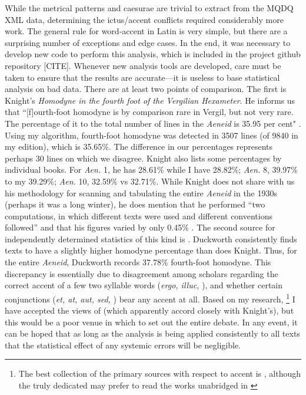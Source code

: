 \documentclass[11pt,a4paper]{scrartcl} %
\begin{document}
{While the metrical patterns and caesurae are trivial to extract from the MQDQ XML data, determining the ictus/accent conflicts required considerably more work. The general rule for word-accent in Latin is very simple, but there are a surprising number of exceptions and edge cases. In the end, it was necessary to develop new code to perform this analysis, which is included in the project github repository [CITE]. Whenever new analysis tools are developed, care must be taken to ensure that the results are accurate---it is useless to base statistical analysis on bad data. There are at least two points of comparison. The first is Knight's \textit{Homodyne in the fourth foot of the Vergilian Hexameter}. He informs us that ``[f]ourth-foot homodyne is by comparison rare in Vergil, but not very rare. The percentage of it to the total number of lines in the \textit{Aeneid} is 35.95 per cent" \cite[186]{knight_homodyne_1931}. Using my algorithm, fourth-foot homodyne was detected in 3507 lines (of 9840 in my edition), which is 35.65\%. The difference in our percentages represents perhaps 30 lines on which we disagree. Knight also lists some percentages by individual books. For \textit{Aen.} 1, he has 28.61\% while I have 28.82\%; \textit{Aen.} 8, 39.97\% to my 39.29\%; \textit{Aen.} 10, 32.59\% vs 32.71\%. While Knight does not share with us his methodology for scanning and tabulating the entire \textit{Aeneid} in the 1930s (perhaps it was a long winter), he does mention that he performed ``two computations, in which different texts were used and different conventions followed'' and that his figures varied by only 0.45\% \cite[186 n. 1]{knight_homodyne_1931}. The second source for independently determined statistics of this kind is \citet[19-20, plus final Table]{duckworth_vergil_1969}. Duckworth consistently finds texts to have a slightly higher homodyne percentage than does Knight. Thus, for the entire \textit{Aeneid}, Duckworth records 37.78\% fourth-foot homodyne. This discrepancy is essentially due to disagreement among scholars regarding the correct accent of a few two syllable words (\textit{ergo, illuc,} \textellipsis), and whether certain conjunctions (\textit{et, at, aut, sed,} \textellipsis) bear any accent at all. Based on my research,%
\footnote{The best collection of the primary sources with respect to accent is \cite{schoell_accentu_1876}, although the truly dedicated may prefer to read the works unabridged in \cite{keil_heinrich_grammatici_1857}}
I have accepted the views of \citet[88-9]{allen_vox_1965} (which apparently accord closely with Knight's), but this would be a poor venue in which to set out the entire debate. In any event, it can be hoped that as long as the analysis is being applied consistently to all texts that the statistical effect of any systemic errors will be negligible.

}
\end{document}
